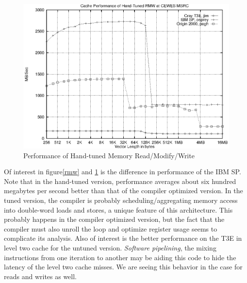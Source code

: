 \documentclass [12pt]{article}
\begin{document}
\begin{figure}[Hht]
\centerline{\includegraphics{pics/cache_cewes_handrmw.ps}}
\caption{Performance of Hand-tuned Memory Read/Modify/Write}\label{handrmw}
\end{figure}

Of interest in figure\ref{rmw} and \ref{handrmw} is the difference 
in performance of the IBM
SP. Note that in the hand-tuned version, performance averages about six 
hundred megabytes per second better than that of the compiler optimized
version. In the tuned version, the compiler is probably scheduling/aggregating
memory access
into double-word loads and stores, a unique feature of this architecture. This probably happens in the compiler
optimized version, but the fact that the compiler must also unroll the loop 
and optimize register usage seems to complicate its analysis. Also of interest is the better
performance on the T3E in level two cache for the untuned version. {\em Software
pipelining}, the mixing instructions from one iteration to another may
be aiding this code to hide the latency of the level two cache misses. We
are seeing this behavior in the case for reads and writes as well.

\clearpage
\newpage
\end{document}
